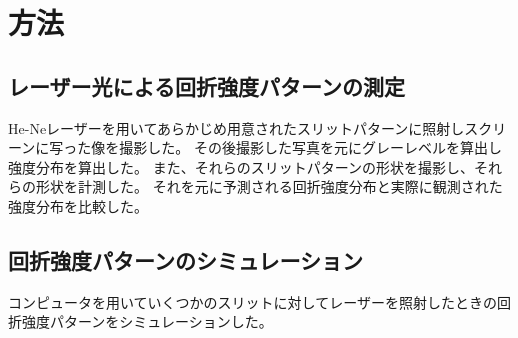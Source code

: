 \documentclass[../../../main]{subfiles}
\begin{document}
\section{方法}

\subsection{レーザー光による回折強度パターンの測定}
He-Neレーザーを用いてあらかじめ用意されたスリットパターンに照射しスクリーンに写った像を撮影した。
その後撮影した写真を元にグレーレベルを算出し強度分布を算出した。
また、それらのスリットパターンの形状を撮影し、それらの形状を計測した。
それを元に予測される回折強度分布と実際に観測された強度分布を比較した。

\subsection{回折強度パターンのシミュレーション}
コンピュータを用いていくつかのスリットに対してレーザーを照射したときの回折強度パターンをシミュレーションした。
\end{document}

